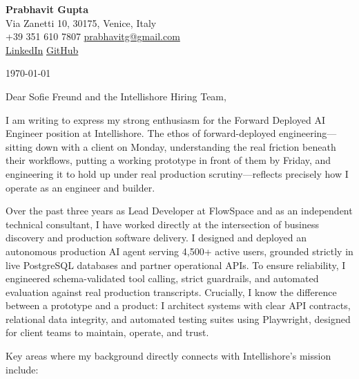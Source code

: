 \documentclass[11pt,a4paper]{article}
\begin{document}
\begin{center}
    {\huge \textbf{Prabhavit Gupta}} \\
    \vspace{4pt}
    Via Zanetti 10, 30175, Venice, Italy \\
    +39 351 610 7807 \textbar{} \href{mailto:prabhavitg@gmail.com}{prabhavitg@gmail.com} \\
    \href{https://www.linkedin.com/in/prabhavit/}{LinkedIn} \textbar{} \href{https://github.com/prab-gupta}{GitHub}
\end{center}

\vspace{14pt}

\noindent \today

\vspace{6pt}

\noindent Dear Sofie Freund and the Intellishore Hiring Team,

\vspace{6pt}

\noindent I am writing to express my strong enthusiasm for the Forward Deployed AI Engineer position at Intellishore. The ethos of forward-deployed engineering—sitting down with a client on Monday, understanding the real friction beneath their workflows, putting a working prototype in front of them by Friday, and engineering it to hold up under real production scrutiny—reflects precisely how I operate as an engineer and builder.

\noindent Over the past three years as Lead Developer at FlowSpace and as an independent technical consultant, I have worked directly at the intersection of business discovery and production software delivery. I designed and deployed an autonomous production AI agent serving 4,500+ active users, grounded strictly in live PostgreSQL databases and partner operational APIs. To ensure reliability, I engineered schema-validated tool calling, strict guardrails, and automated evaluation against real production transcripts. Crucially, I know the difference between a prototype and a product: I architect systems with clear API contracts, relational data integrity, and automated testing suites using Playwright, designed for client teams to maintain, operate, and trust.

\noindent Key areas where my background directly connects with Intellishore's mission include:
\end{document}
